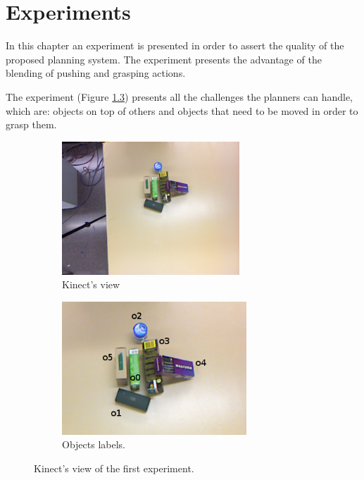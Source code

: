 \chapter{Experiments}
\label{ch:experiments}

In this chapter an experiment is presented in order to assert the quality of the proposed planning system. The experiment presents the advantage of the blending of pushing and grasping actions. 

The experiment (Figure \ref{fig:experiment_good}) presents all the challenges the planners can handle, which are: objects on top of others and objects that need to be moved in order to grasp them. 
\begin{figure}[tb]
\centering
\begin{subfigure}[t]{0.45\textwidth}
\centering
\includegraphics[height=5cm]{Img/experiments/image.png}
\caption{Kinect's view}\label{fig:experiment_good1}
\end{subfigure}
\begin{subfigure}[t]{0.45\textwidth}
\centering
\includegraphics[height=5cm]{Img/experiments/image_labels.png}
\caption{Objects labels.}\label{fig:experiment_good2}
\end{subfigure}
\caption{Kinect's view of the first experiment.}\label{fig:experiment_good}
\end{figure}


